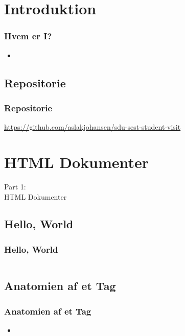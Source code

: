 \section{Introduktion}
\begin{frame}
    \frametitle{Hvem er I?}
    \begin{itemize}
      \item 
    \end{itemize}
\end{frame}

\subsection{Repositorie}
\begin{frame}
    \frametitle{Repositorie}
    \begin{center}
      \url{https://github.com/aslakjohansen/sdu-sest-student-visit}
    \end{center}
\end{frame}

\section{HTML Dokumenter}
\begin{frame}
    \vspace{25mm}
    \begin{center}
        \Huge{Part 1:\\HTML Dokumenter}
    \end{center}
\end{frame}

\subsection{Hello, World}
\begin{frame}
    \frametitle{Hello, World}
    \inputminted{html}{../src/frontend/iteration1_html_hello/index.html}
\end{frame}

\subsection{Anatomien af et Tag}
\begin{frame}
    \frametitle{Anatomien af et Tag}
    \begin{itemize}
      \item 
    \end{itemize}
\end{frame}

